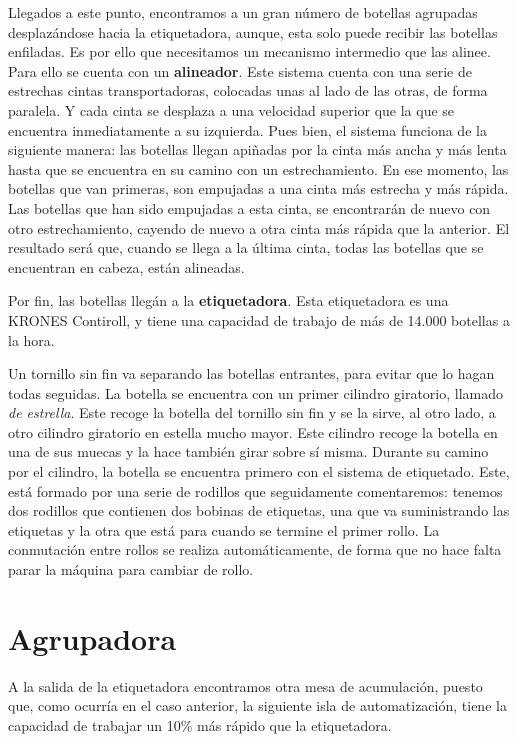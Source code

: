 \documentclass[11pt,a4paper,spanish,twoside]{report}
\begin{document}
Llegados a este punto, encontramos a un gran número de botellas agrupadas 
desplazándose hacia la etiquetadora, aunque, esta solo puede recibir las 
botellas enfiladas. Es por ello que necesitamos un mecanismo intermedio que 
las alinee. Para ello se cuenta con un \textbf{alineador}. Este sistema cuenta
con una serie de estrechas cintas transportadoras, colocadas unas al lado de
las otras, de forma paralela. Y cada cinta se desplaza a una velocidad 
superior que la que se encuentra inmediatamente a su izquierda. Pues bien, el
sistema funciona de la siguiente manera: las botellas llegan apiñadas por la 
cinta más ancha y más lenta hasta que se encuentra en su camino con un 
estrechamiento. En ese momento, las botellas que van primeras, son empujadas
a una cinta más estrecha y más rápida. Las botellas que han sido empujadas a
esta cinta, se encontrarán de nuevo con otro estrechamiento, cayendo de nuevo
a otra cinta más rápida que la anterior. El resultado será que, cuando se 
llega a la última cinta, todas las botellas que se encuentran en cabeza, están
alineadas.

Por fin, las botellas llegán a la \textbf{etiquetadora}. Esta etiquetadora es 
una KRONES Contiroll, y tiene una capacidad de trabajo de más de 14.000 
botellas a la hora.

Un tornillo sin fin va separando las botellas entrantes, para evitar que lo 
hagan todas seguidas. La botella se encuentra con un primer cilindro 
giratorio, llamado \emph{de estrella}. Este recoge la botella del tornillo sin
fin y se la sirve, al otro lado, a otro cilindro giratorio en estella mucho 
mayor. Este cilindro recoge la botella en una de sus muecas y la hace también 
girar sobre sí misma. Durante su camino por el cilindro, la botella se 
encuentra primero con el sistema de etiquetado. Este, está formado por una 
serie de rodillos que seguidamente comentaremos: tenemos dos rodillos que 
contienen dos bobinas de etiquetas, una que va suministrando las etiquetas y
la otra que está para cuando se termine el primer rollo. La conmutación entre
rollos se realiza automáticamente, de forma que no hace falta parar la 
máquina para cambiar de rollo. 


\section{Agrupadora}
A la salida de la etiquetadora encontramos otra mesa de acumulación, puesto 
que, como ocurría en el caso anterior, la siguiente isla de automatización, 
tiene la capacidad de trabajar un 10\% más rápido que la etiquetadora.
\end{document}
